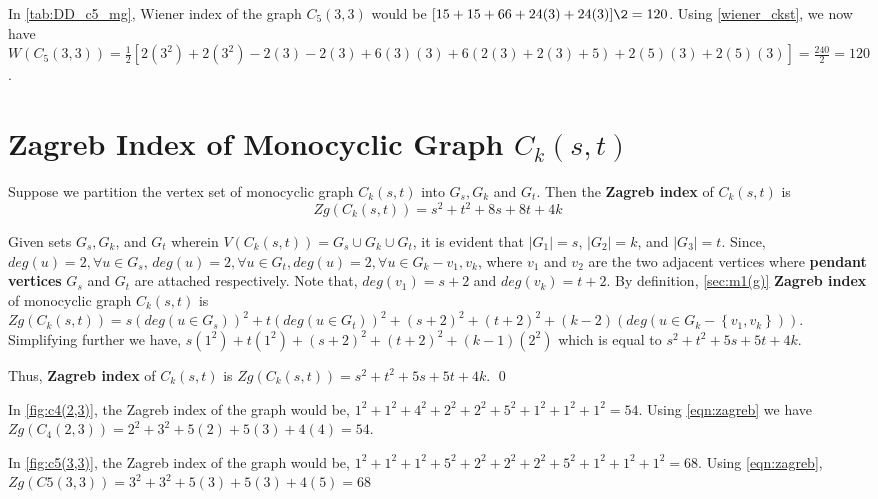 \begin{e.g.}
\begin{e.g.}\rm
In \ref{tab:DD_c5_mg}, Wiener index of the graph $C_5(3,3)$ would be $[15+15+66+24(3)+24(3)]\2=120$. Using \ref{wiener_ckst}, we now have $W(C_5(3,3))=\frac{1}{2}[2(3^2)+2(3^2)-2(3)-2(3)+6(3)(3)+6(2(3)+2(3)+5)+2(5)(3)+2(5)(3)]=\frac{240}{2}=120$.
\end{e.g.}

\section{Zagreb Index of Monocyclic Graph $C_k(s,t)$}

\begin{thm}\rm
Suppose we partition the vertex set of monocyclic graph $C_k(s,t)$ into $G_s,G_k$ and $G_t$. Then the \textbf{Zagreb index} of $C_k(s,t)$ is
\begin{equation}
Zg(C_k(s,t))=s^2+t^2+8s+8t+4k
\label{eqn:zagreb}
\end{equation} 
\end{thm}

\proof Given sets $G_s,G_k$, and $G_t$ wherein $V(C_k(s,t))=G_s\cup G_k\cup G_t$, it is evident that $|G_1|=s$, $|G_2|=k$, and $|G_3|=t$. Since, $deg(u)=2,\forall u\in G_s$, $deg(u)=2,\forall u \in G_t, deg(u)=2, \forall u \in G_k-{v_1,v_k} $, where $v_1$ and $v_2$ are the two adjacent vertices where \textbf{pendant vertices} $G_s$ and $G_t$ are attached respectively. Note that, $deg(v_1)=s+2$ and $deg(v_k)=t+2$. By definition, \href{chap2.tex}{\ref{sec:m1(g)}} \textbf{Zagreb index} of monocyclic graph $C_k(s,t)$ is $Zg(C_k(s,t))=s(deg(u\in G_s))^2+t(deg(u\in G_t))^2+(s+2)^2+(t+2)^2+(k-2)(deg(u\in G_k-\left\lbrace v_1,v_k \right\rbrace))$. Simplifying further we have, $s(1^2)+t(1^2)+(s+2)^2+(t+2)^2+(k-1)(2^2)$ which is equal to $s^2+t^2+5s+5t+4k$. \medskip 

Thus, \textbf{Zagreb index} of $C_k(s,t)$ is $Zg(C_k(s,t))=s^2+t^2+5s+5t+4k$. \qed

\begin{e.g.}\rm
In \ref{fig:c4(2,3)}, the Zagreb index of the graph would be, $1^2+1^2+4^2+2^2+2^2+5^2+1^2+1^2+1^2=54$. Using \ref{eqn:zagreb} we have $Zg(C_4(2,3))=2^2+3^2+5(2)+5(3)+4(4)=54$.
\end{e.g.}

\begin{e.g.}\rm
In \ref{fig:c5(3,3)}, the Zagreb index of the graph would be, $1^2+1^2+1^2+5^2+2^2+2^2+2^2+5^2+1^2+1^2+1^2=68$. Using \ref{eqn:zagreb}, $Zg(C5(3,3))=3^2+3^2+5(3)+5(3)+4(5)=68$
\end{e.g.}


\end{e.g.}
